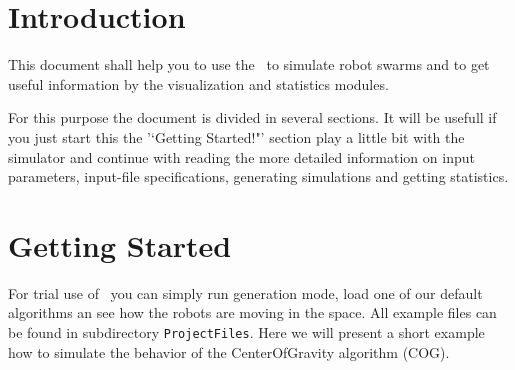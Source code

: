 \documentclass[a4paper,halfparskip,11pt,twoside]{scrartcl}
\begin{document}
\init{}


\section{Introduction}
This document shall help you to use the \RSS\ to simulate robot swarms and to get useful information by the visualization and statistics modules.

For this purpose the document is divided in several sections. It will be usefull if you just start this the '`Getting Started!"' section play a little bit with the simulator and continue with reading the more detailed information on input parameters, input-file specifications, generating simulations and getting statistics. 


\section{Getting Started}
For trial use of \RSS\ you can simply run generation mode, load one of our default algorithms an see how the robots are moving in the space. All example files can be found in subdirectory {\tt ProjectFiles}. Here we will present a short example how to simulate the behavior of the {\sc CenterOfGravity} algorithm (COG).
\end{document}
